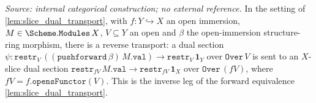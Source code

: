 \begin{lemma}
  \label{lem:slice_dual_transport_inv}
  \textit{Source: internal categorical construction; no external reference.}
  In the setting of \cref{lem:slice_dual_transport}, with \(f : Y \hookrightarrow X\) an open
  immersion, \(M \in \Scheme.\mathtt{Modules}\,X\), \(V \subseteq Y\) an open and \(\beta\)
  the open-immersion structure-ring morphism, there is a reverse transport: a dual section
  \(\psi : \mathtt{restr}_V\,((\mathtt{pushforward}\,\beta)\,M.\mathtt{val}) \to
  \mathtt{restr}_V\,\mathbf 1_Y\) over \(\mathtt{Over}\,V\) is sent to an \(X\)-slice dual
  section \(\mathtt{restr}_{fV}\,M.\mathtt{val} \to \mathtt{restr}_{fV}\,\mathbf 1_X\) over
  \(\mathtt{Over}\,(fV)\), where \(fV = f.\mathtt{opensFunctor}(V)\). This is the inverse leg
  of the forward equivalence \cref{lem:slice_dual_transport}.
\end{lemma}
